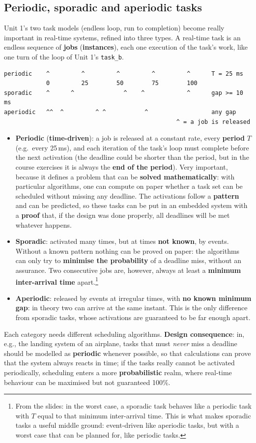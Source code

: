\subsection{Periodic, sporadic and aperiodic tasks}
Unit 1's two task models (endless loop, run to completion) become really important in real-time systems, refined into three types. A real-time task is an endless sequence of \textbf{jobs} (\textbf{instances}), each one execution of the task's work, like one turn of the loop of Unit 1's \texttt{task\_b}.
\begin{verbatim}
periodic    ^         ^         ^         ^         ^      T = 25 ms
            0         25        50        75        100
sporadic    ^      ^              ^    ^            ^      gap >= 10 ms
aperiodic   ^^  ^         ^ ^           ^                  any gap
                                                 ^ = a job is released
\end{verbatim}
\begin{itemize}
    \item \textbf{Periodic} (\textbf{time-driven}): a job is released at a constant rate, every \textbf{period} $T$ (e.g.\ every 25\,ms), and each iteration of the task's loop must complete before the next activation (the deadline could be shorter than the period, but in the course exercises it is always the \textbf{end of the period}). Very important, because it defines a problem that can be \textbf{solved mathematically}: with particular algorithms, one can compute on paper whether a task set can be scheduled without missing any deadline. The activations follow a \textbf{pattern} and can be predicted, so these tasks can be put in an embedded system with a \textbf{proof} that, if the design was done properly, all deadlines will be met whatever happens.
    \item \textbf{Sporadic}: activated many times, but at times \textbf{not known}, by events. Without a known pattern nothing can be proved on paper: the algorithms can only try to \textbf{minimise the probability} of a deadline miss, without an assurance. Two consecutive jobs are, however, always at least a \textbf{minimum inter-arrival time} apart.\footnote{From the slides: in the worst case, a sporadic task behaves like a periodic task with $T$ equal to that minimum inter-arrival time. This is what makes sporadic tasks a useful middle ground: event-driven like aperiodic tasks, but with a worst case that can be planned for, like periodic tasks.}
    \item \textbf{Aperiodic}: released by events at irregular times, with \textbf{no known minimum gap}: in theory two can arrive at the same instant. This is the only difference from sporadic tasks, whose activations are guaranteed to be far enough apart.
\end{itemize}
Each category needs different scheduling algorithms. \textbf{Design consequence}: in, e.g., the landing system of an airplane, tasks that must \emph{never} miss a deadline should be modelled as \textbf{periodic} whenever possible, so that calculations can prove that the system always reacts in time; if the tasks really cannot be activated periodically, scheduling enters a more \textbf{probabilistic} realm, where real-time behaviour can be maximised but not guaranteed 100\%.

